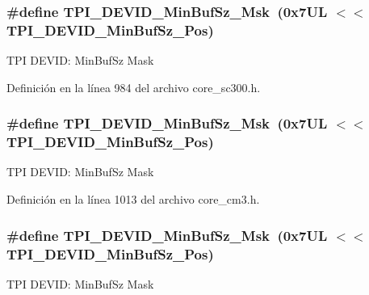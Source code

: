 \subsubsection[{\texorpdfstring{T\+P\+I\+\_\+\+D\+E\+V\+I\+D\+\_\+\+Min\+Buf\+Sz\+\_\+\+Msk}{TPI_DEVID_MinBufSz_Msk}}]{\setlength{\rightskip}{0pt plus 5cm}\#define T\+P\+I\+\_\+\+D\+E\+V\+I\+D\+\_\+\+Min\+Buf\+Sz\+\_\+\+Msk~(0x7\+U\+L $<$$<$ T\+P\+I\+\_\+\+D\+E\+V\+I\+D\+\_\+\+Min\+Buf\+Sz\+\_\+\+Pos)}\hypertarget{group___c_m_s_i_s___t_p_i_ga939e068ff3f1a65b35187ab34a342cd8}{}\label{group___c_m_s_i_s___t_p_i_ga939e068ff3f1a65b35187ab34a342cd8}
T\+PI D\+E\+V\+ID\+: Min\+Buf\+Sz Mask 

Definición en la línea 984 del archivo core\+\_\+sc300.\+h.

\subsubsection[{\texorpdfstring{T\+P\+I\+\_\+\+D\+E\+V\+I\+D\+\_\+\+Min\+Buf\+Sz\+\_\+\+Msk}{TPI_DEVID_MinBufSz_Msk}}]{\setlength{\rightskip}{0pt plus 5cm}\#define T\+P\+I\+\_\+\+D\+E\+V\+I\+D\+\_\+\+Min\+Buf\+Sz\+\_\+\+Msk~(0x7\+U\+L $<$$<$ T\+P\+I\+\_\+\+D\+E\+V\+I\+D\+\_\+\+Min\+Buf\+Sz\+\_\+\+Pos)}\hypertarget{group___c_m_s_i_s___t_p_i_ga939e068ff3f1a65b35187ab34a342cd8}{}\label{group___c_m_s_i_s___t_p_i_ga939e068ff3f1a65b35187ab34a342cd8}
T\+PI D\+E\+V\+ID\+: Min\+Buf\+Sz Mask 

Definición en la línea 1013 del archivo core\+\_\+cm3.\+h.

\subsubsection[{\texorpdfstring{T\+P\+I\+\_\+\+D\+E\+V\+I\+D\+\_\+\+Min\+Buf\+Sz\+\_\+\+Msk}{TPI_DEVID_MinBufSz_Msk}}]{\setlength{\rightskip}{0pt plus 5cm}\#define T\+P\+I\+\_\+\+D\+E\+V\+I\+D\+\_\+\+Min\+Buf\+Sz\+\_\+\+Msk~(0x7\+U\+L $<$$<$ T\+P\+I\+\_\+\+D\+E\+V\+I\+D\+\_\+\+Min\+Buf\+Sz\+\_\+\+Pos)}\hypertarget{group___c_m_s_i_s___t_p_i_ga939e068ff3f1a65b35187ab34a342cd8}{}\label{group___c_m_s_i_s___t_p_i_ga939e068ff3f1a65b35187ab34a342cd8}
T\+PI D\+E\+V\+ID\+: Min\+Buf\+Sz Mask 

